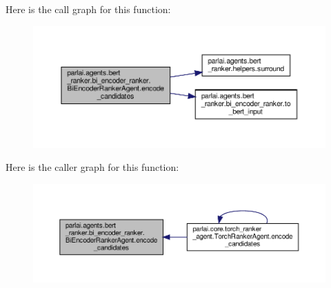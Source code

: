Here is the call graph for this function\+:
\nopagebreak
\begin{figure}[H]
\begin{center}
\leavevmode
\includegraphics[width=350pt]{classparlai_1_1agents_1_1bert__ranker_1_1bi__encoder__ranker_1_1BiEncoderRankerAgent_a98361c5172041c64dc2da76ab9b654a7_cgraph}
\end{center}
\end{figure}
Here is the caller graph for this function\+:
\nopagebreak
\begin{figure}[H]
\begin{center}
\leavevmode
\includegraphics[width=350pt]{classparlai_1_1agents_1_1bert__ranker_1_1bi__encoder__ranker_1_1BiEncoderRankerAgent_a98361c5172041c64dc2da76ab9b654a7_icgraph}
\end{center}
\end{figure}
\mbox{\label{classparlai_1_1agents_1_1bert__ranker_1_1bi__encoder__ranker_1_1BiEncoderRankerAgent_a14ad454025e3db96b5f34e1270e44254}} 
